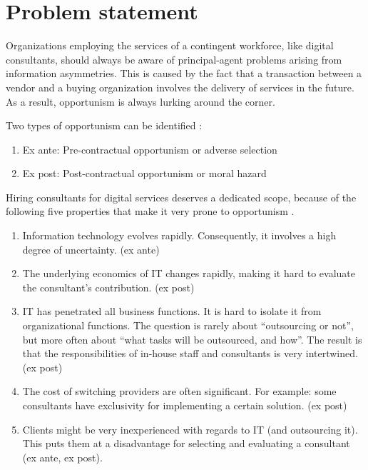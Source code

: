 \documentclass[12pt]{article}
\providecommand{\tightlist}{%
  \setlength{\itemsep}{0pt}\setlength{\parskip}{0pt}}
\begin{document}
\hypertarget{problem-statement}{%
\section{Problem statement}\label{problem-statement}}

Organizations employing the services of a contingent workforce, like
digital consultants, should always be aware of principal-agent problems
arising from information asymmetries. This is caused by the fact that a
transaction between a vendor and a buying organization involves the
delivery of services in the future. As a result, opportunism is always
lurking around the corner.

Two types of opportunism can be identified \citet[242]{clark1993}:

\begin{enumerate}
\def\labelenumi{\arabic{enumi}.}
\tightlist
\item
  Ex ante: Pre-contractual opportunism or adverse selection
\item
  Ex post: Post-contractual opportunism or moral hazard
\end{enumerate}

Hiring consultants for digital services deserves a dedicated scope,
because of the following five properties that make it very prone to
opportunism \citep[ 207]{leslie1995}.

\begin{enumerate}
\def\labelenumi{\arabic{enumi}.}
\tightlist
\item
  Information technology evolves rapidly. Consequently, it involves a
  high degree of uncertainty. (ex ante)
\item
  The underlying economics of IT changes rapidly, making it hard to
  evaluate the consultant's contribution. (ex post)
\item
  IT has penetrated all business functions. It is hard to isolate it
  from organizational functions. The question is rarely about
  ``outsourcing or not'', but more often about ``what tasks will be
  outsourced, and how''. The result is that the responsibilities of
  in-house staff and consultants is very intertwined. (ex post)
\item
  The cost of switching providers are often significant. For example:
  some consultants have exclusivity for implementing a certain solution.
  (ex post)
\item
  Clients might be very inexperienced with regards to IT (and
  outsourcing it). This puts them at a disadvantage for selecting and
  evaluating a consultant (ex ante, ex post).
\end{enumerate}
\end{document}
